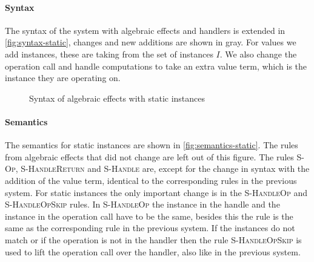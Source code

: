 {\paragraph{Syntax}
The syntax of the system with algebraic effects and handlers is extended in \cref{fig:syntax-static}, changes and new additions are shown in gray. For values we add instances, these are taking from the set of instances $I$. We also change the operation call and handle computations to take an extra value term, which is the instance they are operating on.

\begin{figure}[H]
\caption{Syntax of algebraic effects with static instances}
\centering
{}
\end{figure}

\paragraph{Semantics}
The semantics for static instances are shown in \cref{fig:semantics-static}. The rules from algebraic effects that did not change are left out of this figure. The rules \textsc{S-Op}, \textsc{S-HandleReturn} and \textsc{S-Handle} are, except for the change in syntax with the addition of the value term, identical to the corresponding rules in the previous system. For static instances the only important change is in the \textsc{S-HandleOp} and \textsc{S-HandleOpSkip} rules. In \textsc{S-HandleOp} the instance in the handle and the instance in the operation call have to be the same, besides this the rule is the same as the corresponding rule in the previous system. If the instances do not match or if the operation is not in the handler then the rule \textsc{S-HandleOpSkip} is used to lift the operation call over the handler, also like in the previous system.

}
